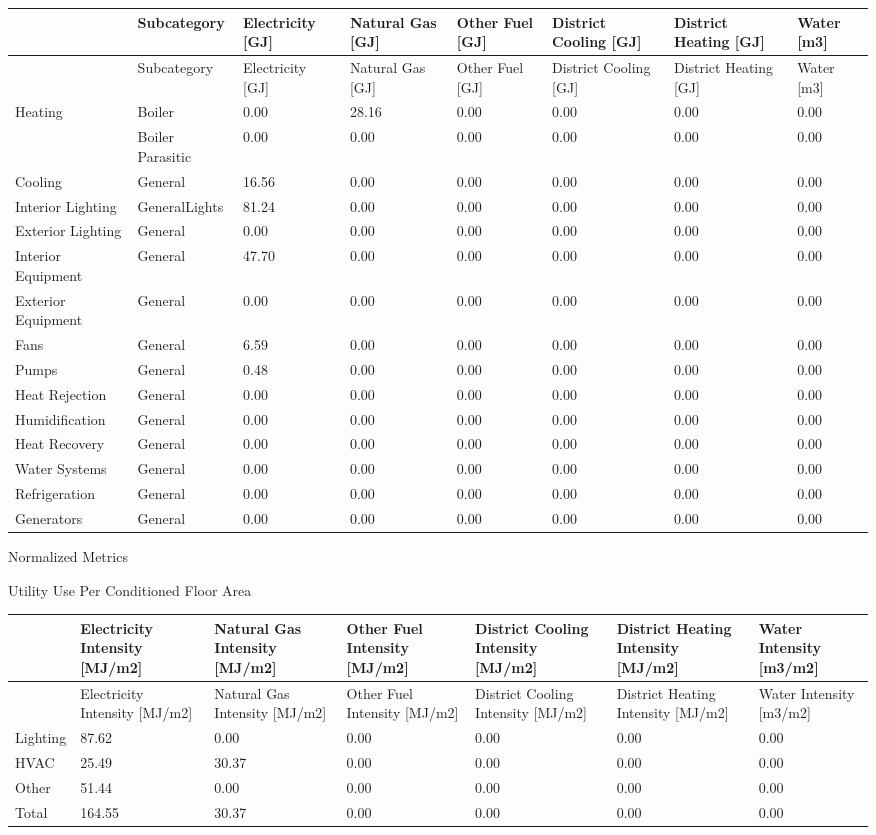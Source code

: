 {\scriptsize
\begin{longtable}[c]{>{\raggedright}p{0.75in}>{\raggedright}p{0.75in}p{0.75in}p{0.75in}p{0.75in}p{0.75in}p{0.75in}p{0.75in}}
\toprule
~ & Subcategory & Electricity [GJ] & Natural Gas [GJ] & Other Fuel [GJ] & District Cooling [GJ] & District Heating [GJ] & Water [m3] \tabularnewline
\midrule
\endfirsthead

\toprule
~ & Subcategory & Electricity [GJ] & Natural Gas [GJ] & Other Fuel [GJ] & District Cooling [GJ] & District Heating [GJ] & Water [m3] \tabularnewline
\midrule
\endhead

Heating & Boiler & 0.00 & 28.16 & 0.00 & 0.00 & 0.00 & 0.00 \tabularnewline
~ & Boiler Parasitic & 0.00 & 0.00 & 0.00 & 0.00 & 0.00 & 0.00 \tabularnewline
Cooling & General & 16.56 & 0.00 & 0.00 & 0.00 & 0.00 & 0.00 \tabularnewline
Interior Lighting & GeneralLights & 81.24 & 0.00 & 0.00 & 0.00 & 0.00 & 0.00 \tabularnewline
Exterior Lighting & General & 0.00 & 0.00 & 0.00 & 0.00 & 0.00 & 0.00 \tabularnewline
Interior Equipment & General & 47.70 & 0.00 & 0.00 & 0.00 & 0.00 & 0.00 \tabularnewline
Exterior Equipment & General & 0.00 & 0.00 & 0.00 & 0.00 & 0.00 & 0.00 \tabularnewline
Fans & General & 6.59 & 0.00 & 0.00 & 0.00 & 0.00 & 0.00 \tabularnewline
Pumps & General & 0.48 & 0.00 & 0.00 & 0.00 & 0.00 & 0.00 \tabularnewline
Heat Rejection & General & 0.00 & 0.00 & 0.00 & 0.00 & 0.00 & 0.00 \tabularnewline
Humidification & General & 0.00 & 0.00 & 0.00 & 0.00 & 0.00 & 0.00 \tabularnewline
Heat Recovery & General & 0.00 & 0.00 & 0.00 & 0.00 & 0.00 & 0.00 \tabularnewline
Water Systems & General & 0.00 & 0.00 & 0.00 & 0.00 & 0.00 & 0.00 \tabularnewline
Refrigeration & General & 0.00 & 0.00 & 0.00 & 0.00 & 0.00 & 0.00 \tabularnewline
Generators & General & 0.00 & 0.00 & 0.00 & 0.00 & 0.00 & 0.00 \tabularnewline
\bottomrule
\end{longtable}}

Normalized Metrics

Utility Use Per Conditioned Floor Area

\begin{longtable}[c]{>{\raggedright}p{0.85in}>{\raggedright}p{0.85in}>{\raggedright}p{0.85in}p{0.85in}p{0.85in}p{0.85in}p{0.85in}}
\toprule
~ & Electricity Intensity [MJ/m2] & Natural Gas Intensity [MJ/m2] & Other Fuel Intensity [MJ/m2] & District Cooling Intensity [MJ/m2] & District Heating Intensity [MJ/m2] & Water Intensity [m3/m2] \tabularnewline
\midrule
\endfirsthead

\toprule
~ & Electricity Intensity [MJ/m2] & Natural Gas Intensity [MJ/m2] & Other Fuel Intensity [MJ/m2] & District Cooling Intensity [MJ/m2] & District Heating Intensity [MJ/m2] & Water Intensity [m3/m2] \tabularnewline
\midrule
\endhead

Lighting & 87.62 & 0.00 & 0.00 & 0.00 & 0.00 & 0.00 \tabularnewline
HVAC & 25.49 & 30.37 & 0.00 & 0.00 & 0.00 & 0.00 \tabularnewline
Other & 51.44 & 0.00 & 0.00 & 0.00 & 0.00 & 0.00 \tabularnewline
Total & 164.55 & 30.37 & 0.00 & 0.00 & 0.00 & 0.00 \tabularnewline
\bottomrule
\end{longtable}

